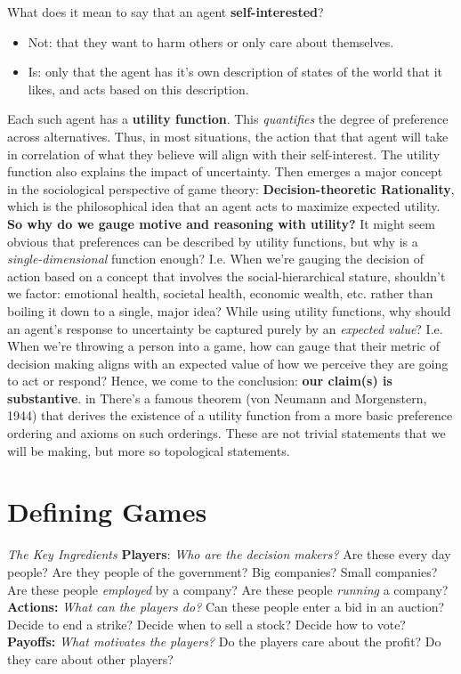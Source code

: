 \documentclass{article}
\begin{document}
What does it mean to say that an agent \textbf{self-interested}?
\begin{itemize}
    \item Not: that they want to harm others or only care about themselves.
    \item Is: only that the agent has it's own description of states of the world that it likes, and acts based on this description.
\end{itemize}
\vskip 0.1in
Each such agent has a \textbf{utility function}. This \emph{quantifies} the degree of preference across alternatives. Thus, in most situations, the action that that agent will take in correlation of what they believe will align with their self-interest. The utility function also explains the impact of uncertainty. Then emerges a major concept in the sociological perspective of game theory: \textbf{Decision-theoretic Rationality}, which is the philosophical idea that an agent acts to maximize expected utility. 
\vskip 0.05in
\textbf{So why do we gauge motive and reasoning with utility?}
\vskip 0.05in
It might seem obvious that preferences can be described by utility functions, but why is a \emph{single-dimensional} function enough? I.e. When we're gauging the decision of action based on a concept that involves the social-hierarchical stature, shouldn't we factor: emotional health, societal health, economic wealth, etc. rather than boiling it down to a single, major idea? While using utility functions, why should an agent's response to uncertainty be captured purely by an \emph{expected value}? I.e. When we're throwing a person into a game, how can gauge that their metric of decision making aligns with an expected value of how we perceive they are going to act or respond? Hence, we come to the conclusion: \textbf{our claim(s) is substantive}. 
 in
There's a famous theorem (von Neumann and Morgenstern, 1944) that derives the existence of a utility function from a more basic preference ordering and axioms on such orderings. These are not trivial statements that we will be making, but more so topological statements.

\section{Defining Games}

\emph{The Key Ingredients}
\vskip 0.1in
\textbf{Players}: \emph{Who are the decision makers?} Are these every day people? Are they people of the government? Big companies? Small companies? Are these people \emph{employed} by a company? Are these people \emph{running} a company?
\vskip 0.05in
\textbf{Actions:} \emph{What can the players do?} Can these people enter a bid in an auction? Decide to end a strike? Decide when to sell a stock? Decide how to vote? 
\vskip 0.05in
\textbf{Payoffs:} \emph{What motivates the players?} Do the players care about the profit? Do they care about other players?
\end{document}

